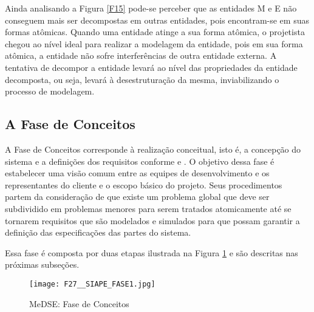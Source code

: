 \begin{description}
Ainda analisando a Figura \ref{F15} pode-se perceber que as entidades M e E não conseguem mais ser decompostas em outras entidades, pois encontram-se em suas formas atômicas. Quando uma entidade atinge a sua forma atômica, o projetista chegou ao nível ideal para realizar a modelagem da entidade, pois em sua forma atômica, a entidade não sofre interferências de outra entidade externa. A tentativa de decompor a entidade levará ao nível das propriedades da entidade decomposta, ou seja, levará à desestruturação da mesma, inviabilizando o processo de modelagem. \par  

\end{description}


\subsection{A Fase de Conceitos}
  
A Fase de Conceitos corresponde  à realização conceitual, isto é, a concepção do sistema e a definições dos requisitos conforme  e . O objetivo dessa fase é estabelecer uma visão comum entre as equipes de desenvolvimento e os representantes do cliente e o escopo básico do projeto. Seus procedimentos partem da consideração de que existe um problema global que deve ser subdividido em problemas menores para serem tratados atomicamente até se tornarem requisitos que são modelados e simulados para que possam garantir a definição das especificações das partes do sistema.
 
Essa fase é composta por duas etapas ilustrada na Figura \ref{F27_1} e são descritas nas próximas subseções.
 
\begin{figure}[h]
 	\centering
 	\texttt{[image: F27\_\_SIAPE\_FASE1.jpg]} 
 	\caption{MeDSE: Fase de Conceitos}
 	\label{F27_1}
\end{figure}
 
